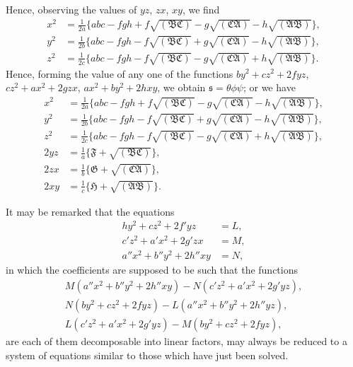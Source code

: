 \documentclass[11pt,a4paper]{book}
\begin{document}
Hence, observing the values of $yz$, $zx$, $xy$, we find
\begin{align*}
x^{2} &= \tfrac{1}{2a}\{abc - fgh + f\sqrt{(\mathfrak{B}\mathfrak{C})} - g\sqrt{(\mathfrak{C}\mathfrak{A})} - h\sqrt{(\mathfrak{A}\mathfrak{B})}\}, \\
y^{2} &= \tfrac{1}{2b}\{abc - fgh - f\sqrt{(\mathfrak{B}\mathfrak{C})} + g\sqrt{(\mathfrak{C}\mathfrak{A})} - h\sqrt{(\mathfrak{A}\mathfrak{B})}\}, \\
z^{2} &= \tfrac{1}{2c}\{abc - fgh - f\sqrt{(\mathfrak{B}\mathfrak{C})} - g\sqrt{(\mathfrak{C}\mathfrak{A})} + h\sqrt{(\mathfrak{A}\mathfrak{B})}\}.
\end{align*}
Hence, forming the value of any one of the functions $by^{2} + cz^{2} + 2fyz$, $cz^{2} + ax^{2} + 2gzx$, $ax^{2} + by^{2} + 2hxy$, we obtain $\mathfrak{s} = \theta\phi\psi$; or we have
\begin{align*}
x^{2} &= \tfrac{1}{2a}\{abc - fgh + f\sqrt{(\mathfrak{B}\mathfrak{C})} - g\sqrt{(\mathfrak{C}\mathfrak{A})} - h\sqrt{(\mathfrak{A}\mathfrak{B})}\}, \\
y^{2} &= \tfrac{1}{2b}\{abc - fgh - f\sqrt{(\mathfrak{B}\mathfrak{C})} + g\sqrt{(\mathfrak{C}\mathfrak{A})} - h\sqrt{(\mathfrak{A}\mathfrak{B})}\}, \\
z^{2} &= \tfrac{1}{2c}\{abc - fgh - f\sqrt{(\mathfrak{B}\mathfrak{C})} - g\sqrt{(\mathfrak{C}\mathfrak{A})} + h\sqrt{(\mathfrak{A}\mathfrak{B})}\}, \\
2yz &= \tfrac{1}{a}\{\mathfrak{F} + \sqrt{(\mathfrak{B}\mathfrak{C})}\}, \\
2zx &= \tfrac{1}{b}\{\mathfrak{G} + \sqrt{(\mathfrak{C}\mathfrak{A})}\}, \\
2xy &= \tfrac{1}{c}\{\mathfrak{H} + \sqrt{(\mathfrak{A}\mathfrak{B})}\}.
\end{align*}

It may be remarked that the equations
\begin{align*}
hy^{2} + cz^{2} + 2f'yz &= L, \\
c'z^{2} + a'x^{2} + 2g'zx &= M, \\
a''x^{2} + b''y^{2} + 2h''xy &= N,
\end{align*}
in which the coefficients are supposed to be such that the functions
\begin{align*}
M(a''x^{2} + b''y^{2} + 2h''xy) - N(c'z^{2} + a'x^{2} + 2g'yz), \\
N(by^{2} + cz^{2} + 2fyz) - L(a''x^{2} + b''y^{2} + 2h''yz), \\
L(c'z^{2} + a'x^{2} + 2g'yz) - M(by^{2} + cz^{2} + 2fyz),
\end{align*}
are each of them decomposable into linear factors, may always be reduced to a system of equations similar to those which have just been solved.
\end{document}
